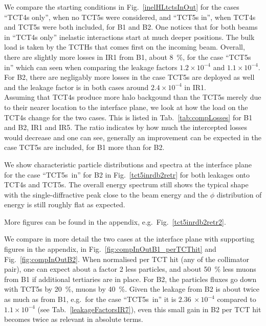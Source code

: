 We compare the starting conditions in Fig.~\ref{inelHLtctsInOut} for the cases ``TCT4s only'', when no TCT5s were considered, and ``TCT5s in'', when TCT4s and TCT5s were both included, for B1 and B2. One notices that for both beams in ``TCT4s only'' inelastic interactions start at much deeper positions. The bulk load is taken by the TCTHs that comes first on the incoming beam. Overall, there are slightly more losses in IR1 from B1, about 8~\%, for the case ``TCT5s in'' which can seen when comparing the leakage factors $1.2 \times 10^{-4}$ and $1.1 \times 10^{-4}$. For B2, there are negligably more losses in the case TCT5s are deployed as well and the leakage factor is in both cases around $2.4 \times 10^{-4}$ in IR1.\\

Assuming that TCT4s produce more halo backgound than the TCT5s merely due to their nearer location to the interface plane, we look at how the load on the TCT4s change for the two cases. This is listed in Tab.~\ref{tab:compLosses} for B1 and B2, IR1 and IR5. The ratio indicates by how much the intercepted losses would decrease and one can see, generally an improvement can be expected in the case TCT5s are included, for B1 more than for B2.


We show characteristic particle distributions and spectra at the interface plane for the case ``TCT5s~in'' for B2 in Fig.~\ref{tct5inrdb2retr} for both leakages onto TCT4s and TCT5s. The overall energy spectrum still shows the typical shape with the single-diffractive peak close to the beam energy and the $\phi$ distribution of energy is still roughly flat as expected.

More figures can be found in the appendix, e.g.~Fig.~\ref{tct5inrdb2retr2}.




We compare in more detail the two cases at the interface plane with supporting figures in the appendix, in Fig.~\ref{fig:compInOutB1_perTCThit} and Fig.~\ref{fig:compInOutB2}. When normalised per TCT hit (any of the collimator pair), one can expect about a factor 2 less particles, and about 50~\% less muons from B1 if additional tertiaries are in place. For B2, the particles fluxes go down with TCT5s by 20~\%, muons by 40~\%. Given the leakage from B2 is about twice as much as from B1, e.g.~for the case ``TCT5s~in'' it is $2.36~\times 10^{-4}$ compared to $1.1 \times 10^{-4}$ (see Tab.~\ref{leakageFactorsIR7}), even this small gain in B2 per TCT hit becomes twice as relevant in absolute terms.

